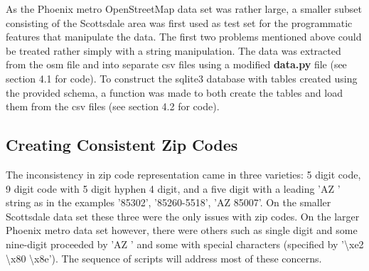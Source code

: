 \documentclass{article}
\begin{document}
As the Phoenix metro OpenStreetMap data set was rather large, a smaller subset consisting of the Scottsdale area was first used as test set for the programmatic features that manipulate the data. The first two problems mentioned above could be treated rather simply with a string manipulation. The data was extracted from the osm file and into separate csv files using a modified \textbf{data.py} file (see section 4.1 for code).  To construct the sqlite3 database with tables created using the provided schema, a function was made to both create the tables and load them from the csv files (see section 4.2 for code).

\subsection{Creating Consistent Zip Codes}
The inconsistency in zip code representation came in three varieties: 5 digit code, 9 digit code with 5 digit hyphen 4 digit, and a five digit with a leading 'AZ ' string as in the examples '85302', '85260-5518', 'AZ 85007'.  On the smaller Scottsdale data set these three were the only issues with zip codes.  On the larger Phoenix metro data set however, there were others such as single digit and some nine-digit proceeded by 'AZ ' and some with special characters (specified by '\textbackslash xe2 \textbackslash x80 \textbackslash x8e').  The sequence of scripts will address most of these concerns.
\end{document}
